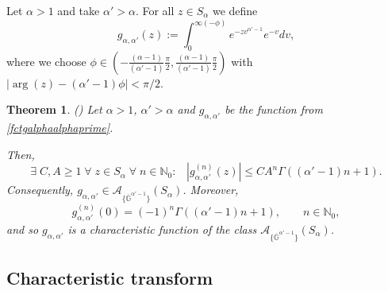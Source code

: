 \documentclass[11pt,a4paper]{article}
\theoremstyle{plain}
\newtheorem{theorem}[proposition]{Theorem}
\theoremstyle{definition}
\newcommand{\NN}{\mathbb{N}}
\newcommand{\G}{\mathbb{G}}
\begin{document}
Let $\alpha>1$ and take $\alpha'>\alpha$. For all $z\in S_\alpha$ we define
\begin{equation}\label{fctgalphaalphaprime}
	g_{\alpha,\alpha'} (z):= \int_{0}^{\infty(-\phi)} e^{-zv^{\alpha'-1}} e^{-v} dv,
\end{equation}
where we choose $\phi  \in (-\frac{(\alpha-1)}{(\alpha'-1)}\frac{\pi}{2}, \frac{(\alpha-1)}{(\alpha'-1)}\frac{\pi}{2})$ with $|\arg(z)- (\alpha'-1)\phi|<\pi/2$.

\begin{theorem}\label{fgalphaalphaprimethm} (\cite[Thm. 28]{salinas62})
	Let $\alpha>1$, $\alpha'>\alpha$ and
$g_{\alpha,\alpha'}$ be the function from
\eqref{fctgalphaalphaprime}.
		
Then,
		\begin{equation}\label{galphagoodestimate}
			\exists\;C,A\ge 1\;\forall\;z\in S_{\alpha}\;\forall\;n\in\NN_0:\;\;\;\left| g_{\alpha,\alpha'}^{(n)}(z)\right|\leq C A^n \Gamma ((\alpha'-1)n+1).
		\end{equation}
		Consequently, $g_{\alpha,\alpha'}\in \mathcal{A}_{\{\overline{\G}^{\alpha'-1}\}}(S_\alpha)$. Moreover,
{$$
g_{\alpha,\alpha'}^{(n)}(0)=(-1)^n  \Gamma((\alpha'-1)n+1),\qquad n\in\NN_0,
$$
and so} $g_{\alpha,\alpha'}$ is a characteristic function of the class $\mathcal{A}_{\{\overline{\G}^{\alpha'-1}\}}(S_\alpha)$.
\end{theorem}

\subsection{Characteristic transform}\label{ssect.CharactTransf}
\end{document}
